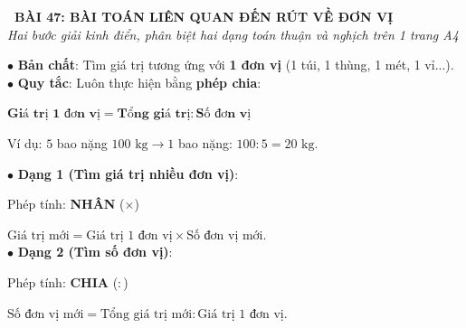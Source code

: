 \documentclass[14pt,a4paper,oneside]{extbook}
\begin{document}
\noindent
\begin{tcolorbox}[
  enhanced,
  colback=teal!8!white,
  colframe=teal!80!black,
  arc=3mm, boxrule=1pt,
  left=3mm, right=3mm, top=2mm, bottom=2mm,
  halign=center
]
  {\Large\bfseries\color{teal!90!black}\faBookmark\ BÀI 47: BÀI TOÁN LIÊN QUAN ĐẾN RÚT VỀ ĐƠN VỊ}\\[1.5pt]
  {\footnotesize\itshape\color{black!75} Hai bước giải kinh điển, phân biệt hai dạng toán thuận và nghịch trên 1 trang A4}
\end{tcolorbox}

\vspace{2mm}

\noindent
\begin{minipage}[t]{0.49\textwidth}
  \begin{tcolorbox}[
    enhanced,
    title={\footnotesize\bfseries\color{white}\faStepForward\ 1. Bước 1: Rút về đơn vị (Luôn là : )},
    colback=blue!2!white,
    colframe=blue!75!black,
    arc=2.5mm, boxrule=0.8pt, top=1.8mm, bottom=1.8mm, left=2mm, right=2mm
  ]
    \footnotesize
    $\bullet$ \textbf{Bản chất}: Tìm giá trị tương ứng với \textbf{1 đơn vị} (1 túi, 1 thùng, 1 mét, 1 vỉ...).\\
    $\bullet$ \textbf{Quy tắc}: Luôn thực hiện bằng \textbf{phép chia}:
    \begin{center}
      $\mathbf{\text{Giá trị 1 đơn vị} = \text{Tổng giá trị} : \text{Số đơn vị}}$
    \end{center}
    Ví dụ: $5$ bao nặng $100\text{ kg} \rightarrow 1$ bao nặng: $100 : 5 = 20\text{ kg}$.
  \end{tcolorbox}
\end{minipage}%
\hfill
\begin{minipage}[t]{0.49\textwidth}
  \begin{tcolorbox}[
    enhanced,
    title={\footnotesize\bfseries\color{white}\faCodeFork\ 2. Bước 2: Phân biệt 2 dạng toán},
    colback=teal!2!white,
    colframe=teal!75!black,
    arc=2.5mm, boxrule=0.8pt, top=1.8mm, bottom=1.8mm, left=2mm, right=2mm
  ]
    \footnotesize
    $\bullet$ \textbf{Dạng 1 (Tìm giá trị nhiều đơn vị)}:
    \begin{center}
      Phép tính: \textbf{NHÂN} ($\times$)
    \end{center}
    $\text{Giá trị mới} = \text{Giá trị 1 đơn vị} \times \text{Số đơn vị mới}$.\\
    $\bullet$ \textbf{Dạng 2 (Tìm số đơn vị)}:
    \begin{center}
      Phép tính: \textbf{CHIA} ($:$)
    \end{center}
    $\text{Số đơn vị mới} = \text{Tổng giá trị mới} : \text{Giá trị 1 đơn vị}$.
  \end{tcolorbox}
\end{minipage}
\end{document}
